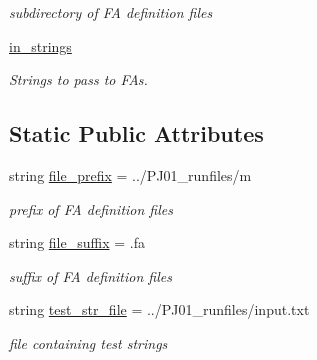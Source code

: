 \begin{DoxyCompactItemize}
\begin{DoxyCompactList}\small\item\em subdirectory of FA definition files \end{DoxyCompactList}\item 
\mbox{\label{classfa__master_1_1_f_a___master_ae67e7f9e55fb02ff98628b30293f66f8}} 
\mbox{\hyperlink{classfa__master_1_1_f_a___master_ae67e7f9e55fb02ff98628b30293f66f8}{in\+\_\+strings}}
\begin{DoxyCompactList}\small\item\em Strings to pass to F\+As. \end{DoxyCompactList}\end{DoxyCompactItemize}
\subsection*{Static Public Attributes}
\begin{DoxyCompactItemize}
\item 
\mbox{\label{classfa__master_1_1_f_a___master_a6fe3860cac9dd2c04e1901ae0960e92b}} 
string \mbox{\hyperlink{classfa__master_1_1_f_a___master_a6fe3860cac9dd2c04e1901ae0960e92b}{file\+\_\+prefix}} = \textquotesingle{}../P\+J01\+\_\+runfiles/m\textquotesingle{}
\begin{DoxyCompactList}\small\item\em prefix of FA definition files \end{DoxyCompactList}\item 
\mbox{\label{classfa__master_1_1_f_a___master_abc583747df063fdade733b94afaf3204}} 
string \mbox{\hyperlink{classfa__master_1_1_f_a___master_abc583747df063fdade733b94afaf3204}{file\+\_\+suffix}} = \textquotesingle{}.fa\textquotesingle{}
\begin{DoxyCompactList}\small\item\em suffix of FA definition files \end{DoxyCompactList}\item 
\mbox{\label{classfa__master_1_1_f_a___master_ae75117dcc6e779441a3b7286e54e3d88}} 
string \mbox{\hyperlink{classfa__master_1_1_f_a___master_ae75117dcc6e779441a3b7286e54e3d88}{test\+\_\+str\+\_\+file}} = \textquotesingle{}../P\+J01\+\_\+runfiles/input.\+txt\textquotesingle{}
\begin{DoxyCompactList}\small\item\em file containing test strings \end{DoxyCompactList}\end{DoxyCompactItemize}


